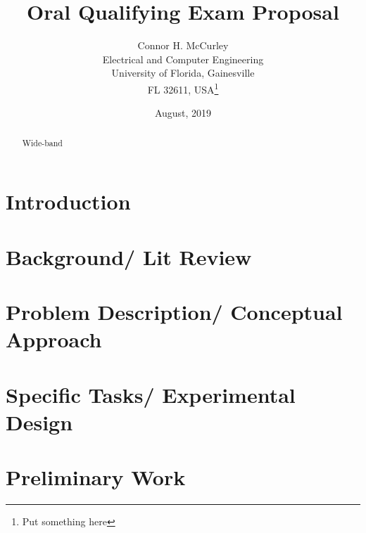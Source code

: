 \documentclass{article}[12 pt]
\begin{document}
\title{Oral Qualifying Exam Proposal}
\date{August, 2019}
\author{Connor H. McCurley\\ Electrical and Computer Engineering\\ University of Florida, Gainesville\\FL 32611, USA\thanks{Put something here}}

\maketitle


\begin{abstract}
Wide-band
\end{abstract}

\section*{Introduction}

\section*{Background/ Lit Review}

\section*{Problem Description/ Conceptual Approach}

\section*{Specific Tasks/ Experimental Design}

\section*{Preliminary Work}
\end{document}
